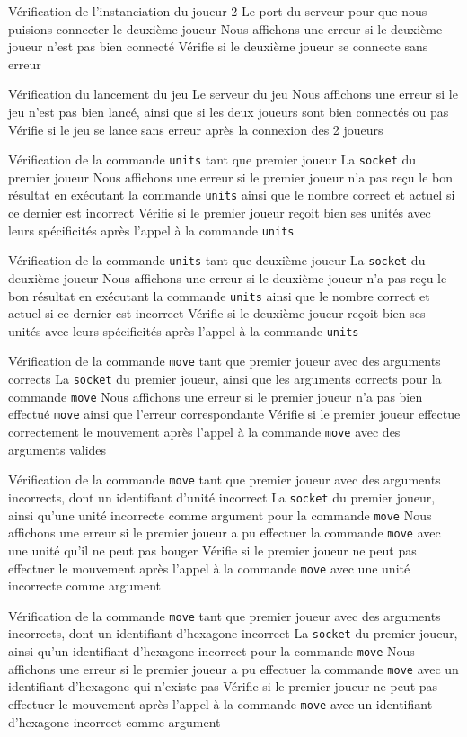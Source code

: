 \mytest
{Vérification de l'instanciation du joueur 2}
{Le port du serveur pour que nous puisions connecter le deuxième joueur}
{Nous affichons une erreur si le deuxième joueur n'est pas bien connecté}
{Vérifie si le deuxième joueur se connecte sans erreur}

\mytest
{Vérification du lancement du jeu}
{Le serveur du jeu}
{Nous affichons une erreur si le jeu n'est pas bien lancé, ainsi que si les deux joueurs sont bien connectés ou pas}
{Vérifie si le jeu se lance sans erreur après la connexion des 2 joueurs}

\mytest
{Vérification de la commande {\tt units} tant que premier joueur}
{La {\tt socket} du premier joueur}
{Nous affichons une erreur si le premier joueur n'a pas reçu le bon résultat en exécutant la commande {\tt units} ainsi que le nombre correct et actuel si ce dernier est incorrect}
{Vérifie si le premier joueur reçoit bien ses unités avec leurs spécificités après l'appel à la commande {\tt units}}

\mytest
{Vérification de la commande {\tt units} tant que deuxième joueur}
{La {\tt socket} du deuxième joueur}
{Nous affichons une erreur si le deuxième joueur n'a pas reçu le bon résultat en exécutant la commande {\tt units} ainsi que le nombre correct et actuel si ce dernier est incorrect}
{Vérifie si le deuxième joueur reçoit bien ses unités avec leurs spécificités après l'appel à la commande {\tt units}}

\mytest
{Vérification de la commande {\tt move} tant que premier joueur avec des arguments corrects}
{La {\tt socket} du premier joueur, ainsi que les arguments corrects pour la commande {\tt move}}
{Nous affichons une erreur si le premier joueur n'a pas bien effectué {\tt move} ainsi que l'erreur correspondante}
{Vérifie si le premier joueur effectue correctement le mouvement après l'appel à la commande {\tt move} avec des arguments valides}

\mytest
{Vérification de la commande {\tt move} tant que premier joueur avec des arguments incorrects, dont un identifiant d'unité incorrect}
{La {\tt socket} du premier joueur, ainsi qu'une unité incorrecte comme argument pour la commande {\tt move}}
{Nous affichons une erreur si le premier joueur a pu effectuer la commande {\tt move} avec une unité qu'il ne peut pas bouger}
{Vérifie si le premier joueur ne peut pas effectuer le mouvement après l'appel à la commande {\tt move} avec une unité incorrecte comme argument}

\mytest
{Vérification de la commande {\tt move} tant que premier joueur avec des arguments incorrects, dont un identifiant d'hexagone incorrect}
{La {\tt socket} du premier joueur, ainsi qu'un identifiant d'hexagone incorrect pour la commande {\tt move}}
{Nous affichons une erreur si le premier joueur a pu effectuer la commande {\tt move} avec un identifiant d'hexagone qui n'existe pas}
{Vérifie si le premier joueur ne peut pas effectuer le mouvement après l'appel à la commande {\tt move} avec un identifiant d'hexagone incorrect comme argument}

